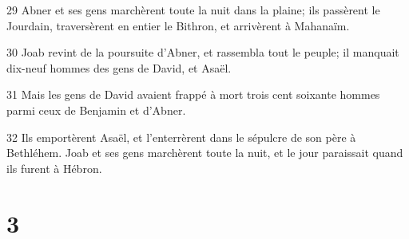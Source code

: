 \par 29 Abner et ses gens marchèrent toute la nuit dans la plaine; ils passèrent le Jourdain, traversèrent en entier le Bithron, et arrivèrent à Mahanaïm.
\par 30 Joab revint de la poursuite d'Abner, et rassembla tout le peuple; il manquait dix-neuf hommes des gens de David, et Asaël.
\par 31 Mais les gens de David avaient frappé à mort trois cent soixante hommes parmi ceux de Benjamin et d'Abner.
\par 32 Ils emportèrent Asaël, et l'enterrèrent dans le sépulcre de son père à Bethléhem. Joab et ses gens marchèrent toute la nuit, et le jour paraissait quand ils furent à Hébron.

\chapter{3}

